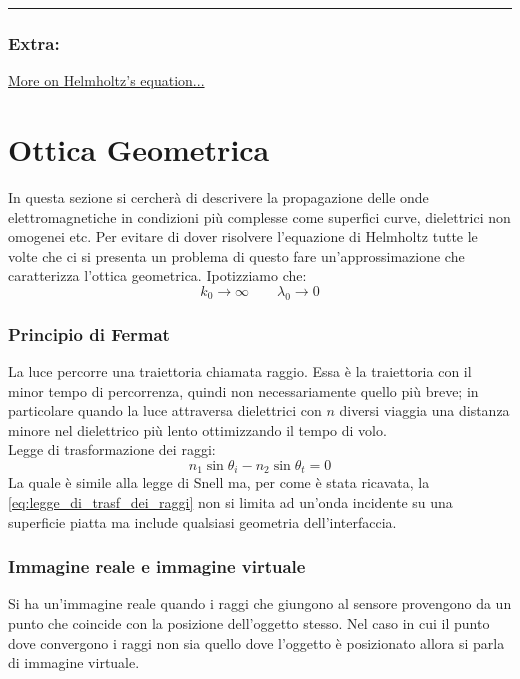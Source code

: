\documentclass{article}
\begin{document}
\vfill
\hrule
\subsubsection*{Extra:}
\href{https://physics.stackexchange.com/questions/334084/wave-vs-helmholtz-equation}{More on Helmholtz's equation...}

\newpage

\section*{Ottica Geometrica}
In questa sezione si cercherà di descrivere la propagazione delle onde elettromagnetiche in condizioni più complesse come superfici curve, dielettrici non omogenei etc.
Per evitare di dover risolvere l'equazione di Helmholtz tutte le volte che ci si presenta un problema di questo fare un'approssimazione che caratterizza l'ottica geometrica.
Ipotizziamo che:
\begin{equation*}
k_0 \rightarrow \infty \qquad \lambda_0 \rightarrow 0
\end{equation*}
\subsubsection*{Principio di Fermat}
La luce percorre una traiettoria chiamata raggio. Essa è la traiettoria con il minor tempo di percorrenza, quindi non necessariamente quello più breve; in particolare quando la luce attraversa dielettrici con $n$ diversi viaggia una distanza minore nel dielettrico più lento ottimizzando il tempo di volo.\\
Legge di trasformazione dei raggi:
\begin{equation}	\label{eq:legge_di_trasf_dei_raggi}
n_1 \sin\theta_i - n_2 \sin\theta_t = 0
\end{equation}
La quale è simile alla legge di Snell ma, per come è stata ricavata, la \eqref{eq:legge_di_trasf_dei_raggi} non si limita ad un'onda incidente su una superficie piatta ma include qualsiasi geometria dell'interfaccia.

\subsubsection*{Immagine reale e immagine virtuale}
Si ha un'immagine reale quando i raggi che giungono al sensore provengono da un punto che coincide con la posizione dell'oggetto stesso. Nel caso in cui il punto dove convergono i raggi non sia quello dove l'oggetto è posizionato allora si parla di immagine virtuale.
\end{document}
